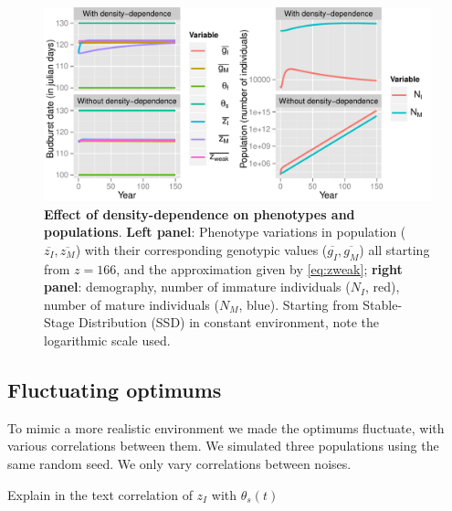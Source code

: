 \begin{figure}[ht!]
	\centering
	\includegraphics[scale=1]{Figures/DDphenopop.pdf}
	\caption{\textbf{Effect of density-dependence on phenotypes and populations}. \textbf{Left panel}: Phenotype variations in population ($\overline{z_I}, \overline{z_M}$) with their corresponding genotypic values ($\overline{g_I}, \overline{g_M}$) all starting from $z = 166$, and the approximation given by \autoref{eq:zweak}; \textbf{right panel}: demography, number of immature individuals ($N_I$, red), number of mature individuals ($N_M$, blue). Starting from Stable-Stage Distribution (SSD) in constant environment, note the logarithmic scale used.}
	\label{fig:dd}
\end{figure}

\subsection*{Fluctuating optimums}

To mimic a more realistic environment we made the optimums fluctuate, with various correlations between them. We simulated three populations using the same random seed. We only vary correlations between noises.

Explain in the text correlation of $z_{I}$ with $\theta_{s}(t)$

